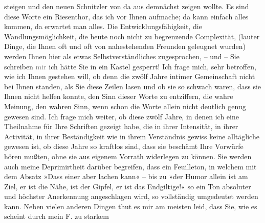 \begin{ledgroupsized}[t]{13cm}
               steigen und den neuen Schnitzler von da aus demnächst zeigen wollte. Es sind diese
               Worte ein Riesenthor, das ich vor Ihnen aufmache; da kann einfach alles kommen, da
               erwartet man alles. Die Entwicklungsfähigkeit, die Wandlungsmöglichkeit, die heute
               noch nicht zu begrenzende Complexität, (lauter Dinge, die Ihnen oft und oft von
               nahestehenden Freunden geleugnet wurden) werden Ihnen hier als etwas
               Selbstverständliches zugesprochen, – und – Sie schreiben \textcolor{gray}{mir} ich
               hätte Sie in ein Kastel gesperrt! \pend
           \pstart
           Ich frage mich, sehr betroffen, wie ich Ihnen gestehen will, ob denn die zwölf Jahre
               intimer Gemeinschaft nicht bei Ihnen standen, als Sie diese Zeilen lasen und ob sie
               so schwach waren,  dass sie Ihnen nicht helfen
               konnte, den Sinn dieser Worte zu entziffern, die wahre Meinung, den wahren Sinn, wenn
               schon die Worte allein nicht deutlich genug gewesen sind. Ich frage mich weiter, ob
               diese zwölf Jahre, in denen ich eine Theilnahme für Ihre Schriften gezeigt habe, die
               in ihrer Intensität, in ihrer Activität, in ihrer Beständigkeit wie in ihrem
               Verständnis gewiss keine alltägliche gewesen ist, ob diese Jahre so kraftlos sind,
               dass sie beschämt Ihre Vorwürfe hören mußten, ohne sie aus eigenem Vorrath widerlegen
               zu können. \pend
           \pstart
           Sie werden auch meine Deprimirtheit darüber begreifen, dass ein Feuilleton, in
               welchem mit dem Absatz »Dass einer
                  aber lachen kann« – bis zu »der Humor allein ist am Ziel, er ist die Nähe, ist der Gipfel, er ist das
                  Endgiltige!« so ein Ton absoluter und höchster Anerkennung angeschlagen wird,
               so vollständig umgedeutet werden kann. \pend
           \pstart
           Neben vielen anderen Dingen thut es mir am meisten leid, dass Sie, wie es scheint
               durch mein F. zu starkem

\end{ledgroupsized}
